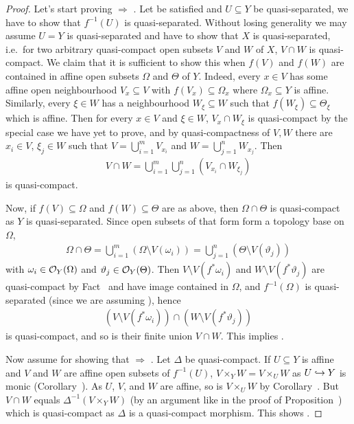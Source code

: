 \documentclass[a4paper,parskip=half,numbers=enddot, DIV=12]{scrreprt}
\begin{document}
\begin{proof}
    Let's start proving  $\Rightarrow$ . Let  be satisfied and $U\subseteq Y$ be quasi-separated, we have to show that $f^{-1}(U)$ is quasi-separated. Without losing generality we may assume $U=Y$ is quasi-separated and have to show that $X$ is quasi-separated, i.e.\ for two arbitrary quasi-compact open subsets $V$ and $W$ of $X$, $V\cap W$ is quasi-compact. We claim that it is sufficient to show this when $f(V)$ and $f(W)$ are contained in affine open subsets $\Omega$ and $\Theta$ of $Y$. Indeed, every $x\in V$ has some affine open neighbourhood $V_x\subseteq V$ with $f(V_x)\subseteq \Omega_x$ where $\Omega_x \subseteq Y$ is affine. Similarly, every $\xi\in W$ has a neighbourhood $W_\xi\subseteq W$ such that $f(W_\xi)\subseteq \Theta_\xi$ which is affine. Then for every $x\in V$ and $\xi \in W$, $V_x\cap W_\xi$ is quasi-compact by the special case we have yet to prove, and by quasi-compactness of $V,W$ there are $x_i\in V$, $\xi_j\in W$ such that $V=\bigcup_{i=1}^m V_{x_i}$ and $W = \bigcup_{j=1}^n W_{x_j}$. Then
    \begin{align*}
        V\cap W = \bigcup_{i=1}^m \bigcup_{j=1}^n (V_{x_i}\cap W_{\xi_j})
    \end{align*}
    is quasi-compact.
    
    Now, if $f(V)\subseteq \Omega$ and $f(W)\subseteq \Theta$ are as above, then $\Omega\cap \Theta$ is quasi-compact as $Y$ is quasi-separated. Since open subsets of that form form a topology base on $\Omega$, 
    \begin{align*}
        \Omega\cap \Theta = \bigcup_{i=1}^m (\Omega\setminus V(\omega_i))=\bigcup_{j=1}^n(\Theta \setminus V(\vartheta_j))
    \end{align*}
    with $\omega_i\in \mathcal{O}_Y(\Omega)$ and $\vartheta_j\in \mathcal{O}_Y(\Theta)$. Then $V\setminus V(f^*\omega_i)$ and $W\setminus V(f^* \vartheta_j)$ are quasi-compact by Fact~ and have image contained in $\Omega$, and $f^{-1}(\Omega)$ is quasi-separated (since we are assuming ), hence
    \begin{align*}
        (V\setminus V(f^*\omega_i))\cap (W\setminus V(f^* \vartheta_j))
    \end{align*}
    is quasi-compact, and so is their finite union $V\cap W$. This implies .
    
    Now assume  for showing that  $\Rightarrow$ . Let $\Delta$ be quasi-compact. If $U\subseteq Y$ is affine and $V$ and $W$ are affine open subsets of $f^{-1}(U)$, $V\times_Y W = V\times_U W$ as $U\monomorphism Y$ is monic (Corollary~). As $U$, $V$, and $W$ are affine, so is $V\times_U W$ by Corollary~. But $V\cap W$ equals $\Delta^{-1}(V\times_Y W)$ (by an argument like in the proof of Proposition~) which is quasi-compact as $\Delta$ is a quasi-compact morphism. This shows .
    

\end{proof}
\end{document}
